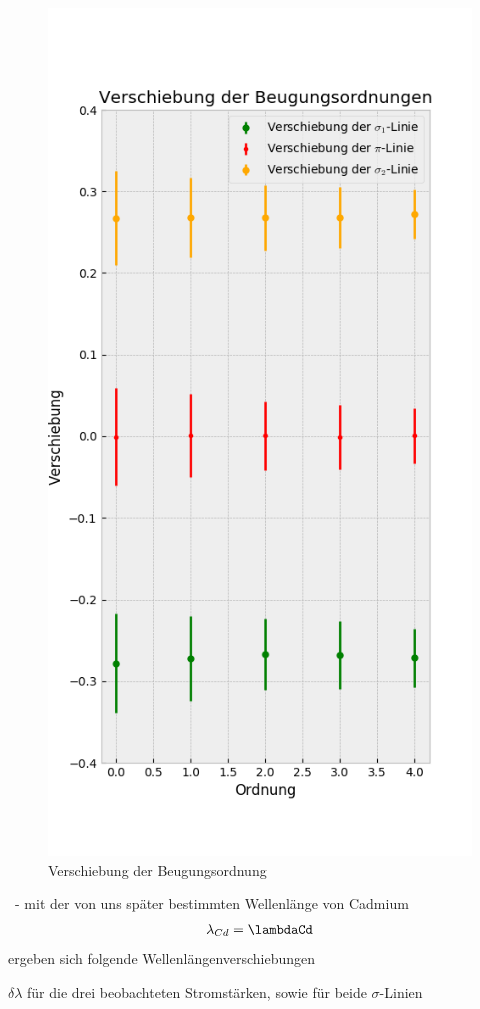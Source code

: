 \begin{myframe}{}
\begin{figure}
              \includegraphics[height=.85\paperheight]{img/diff_sco13A}
              \caption{Verschiebung der Beugungsordnung} 
          \end{figure}
      \end{myframe}
      \begin{myframe}{\subsecname\ - \subsubsecname}
          mit der von uns sp\"ater bestimmten Wellenl\"ange von Cadmium
          \begin{align}
              \lambda_{Cd}=\lambdaCd 
          \end{align} 
          ergeben sich folgende Wellenl\"angenverschiebungen
          \begin{table}[H]
              \centering
              
              \caption{$\delta\lambda$ für die drei beobachteten Stromstärken, sowie für beide $\sigma$-Linien}
          \end{table}
      \end{myframe}
